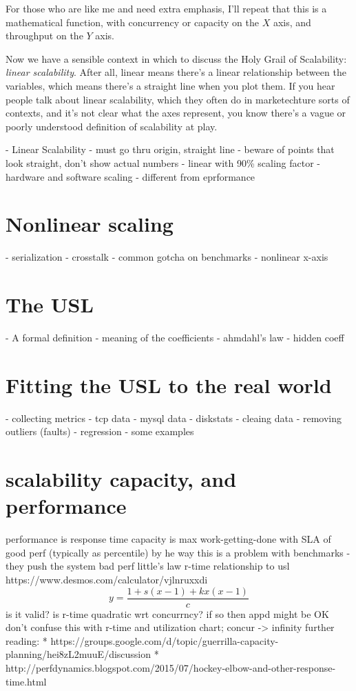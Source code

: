 \documentclass{vivid_layout_pdf}
\begin{document}
For those who are like me and need extra
emphasis, I'll repeat that this is a mathematical function, with concurrency or
capacity on the $X$ axis, and throughput on the $Y$ axis.

Now we have a sensible context in which to discuss the Holy Grail of
Scalability: {\itshape linear scalability}. After all, linear means there's a
linear relationship between the variables, which means there's a straight line
when you plot them. If you hear people talk about linear scalability, which they
often do in marketechture sorts of contexts, and it's not clear what the axes
represent, you know there's a vague or poorly understood definition of
scalability at play.

	- Linear Scalability
	- must go thru origin, straight line
	- beware of points that look straight, don't show actual numbers
	- linear with 90\% scaling factor
	- hardware and software scaling
	- different from eprformance
\section{Nonlinear scaling}
  - serialization
  - crosstalk
  - common gotcha on benchmarks - nonlinear x-axis
\section{The USL}
	- A formal definition
	- meaning of the coefficients
	- ahmdahl's law
	- hidden coeff
\section{Fitting the USL to the real world}
	- collecting metrics
		- tcp data
		- mysql data
		- diskstats
	- cleaing data - removing outliers (faults)
	- regression
	- some examples
\section{scalability capacity, and performance}
  performance is response time
  capacity  is max work-getting-done with SLA of good perf (typically as percentile)
	 by he way this is a problem with benchmarks - they push the system bad perf
	little's law
	r-time relationship to usl
	https://www.desmos.com/calculator/vjlnruxxdi
	\[
	y=\frac{1+s(x-1)+kx(x-1)}{c}
	\]
	is it valid? is r-time quadratic wrt concurrncy? if so then appd might be OK
	don't confuse this with r-time and utilization chart; concur -> infinity
	further reading:
 * https://groups.google.com/d/topic/guerrilla-capacity-planning/hei8zL2muuE/discussion
  * http://perfdynamics.blogspot.com/2015/07/hockey-elbow-and-other-response-time.html
\end{document}
